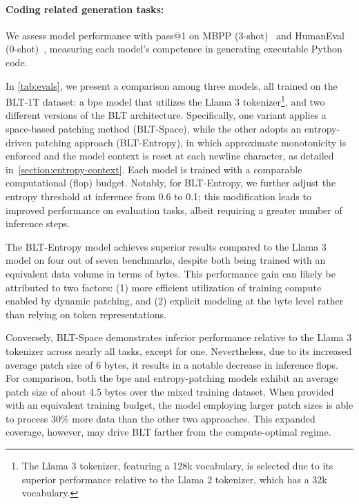 \paragraph{Coding related generation tasks:} We assess model performance with pass@1 on MBPP (3-shot)~\citep{Eval_MBPP} and HumanEval (0-shot)~\citep{Eval_HumanEval}, measuring each model's competence in generating executable Python code.

In \autoref{tab:evals}, we present a comparison among three models, all trained on the {\textsc BLT}-1T dataset: a bpe model that utilizes the Llama 3 tokenizer\footnote{The Llama 3 tokenizer, featuring a 128k vocabulary, is selected due to its superior performance relative to the Llama 2 tokenizer, which has a 32k vocabulary.}, and two different versions of the {\textsc BLT} architecture. Specifically, one variant applies a space-based patching method ({\textsc BLT}-Space), while the other adopts an entropy-driven patching approach ({\textsc BLT}-Entropy), in which approximate monotonicity is enforced and the model context is reset at each newline character, as detailed in~\autoref{section:entropy-context}. Each model is trained with a comparable computational (flop) budget. Notably, for {\textsc BLT}-Entropy, we further adjust the entropy threshold at inference from 0.6 to 0.1; this modification leads to improved performance on evaluation tasks, albeit requiring a greater number of inference steps.

The {\textsc BLT}-Entropy model achieves superior results compared to the Llama 3 model on four out of seven benchmarks, despite both being trained with an equivalent data volume in terms of bytes. This performance gain can likely be attributed to two factors: (1) more efficient utilization of training compute enabled by dynamic patching, and (2) explicit modeling at the byte level rather than relying on token representations.

Conversely, {\textsc BLT}-Space demonstrates inferior performance relative to the Llama 3 tokenizer across nearly all tasks, except for one. Nevertheless, due to its increased average patch size of 6 bytes, it results in a notable decrease in inference flops. For comparison, both the bpe and entropy-patching models exhibit an average patch size of about 4.5 bytes over the mixed training dataset. When provided with an equivalent training budget, the model employing larger patch sizes is able to process 30\% more data than the other two approaches. This expanded coverage, however, may drive {\textsc BLT} farther from the compute-optimal regime.

